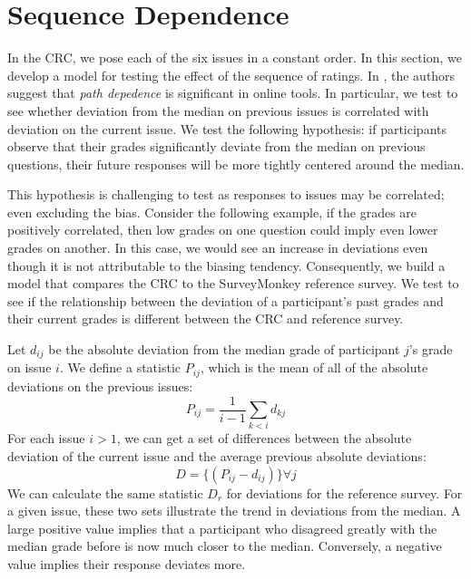 \section{Sequence Dependence}
\label{path}
In the CRC, we pose each of the six issues in a constant order.
In this section, we develop a model for testing the effect of the sequence of ratings.
In \cite{???}, the authors suggest that \emph{path depedence} is significant in online tools.
In particular, we test to see whether deviation from the median on previous issues is correlated with deviation on the current issue.
We test the following hypothesis: if participants observe that their grades significantly deviate from the median on previous questions, their future responses will be more tightly centered around the median.

This hypothesis is challenging to test as responses to issues may be correlated; even excluding the bias.
Consider the following example, if the grades are positively correlated, then low grades on one question could imply even lower grades on another.
In this case, we would see an increase in deviations even though it is not attributable to the biasing tendency.
Consequently, we build a model that compares the CRC to the SurveyMonkey reference survey.
We test to see if the relationship between the deviation of a participant's past grades and their current grades is different between the CRC and reference survey.

Let $d_{ij}$ be the absolute deviation from the median grade of participant $j$'s grade on issue $i$. 
We define a statistic $P_{ij}$, which is the mean of all of the absolute deviations on the previous issues:
\begin{equation}
P_{ij} = \frac{1}{i-1} \sum_{k < i}  d_{kj}
\end{equation}
For each issue $i > 1$, we can get a set of differences between the absolute deviation of the current issue and the average previous absolute deviations:
\begin{equation}
D = \{(P_{ij}-d_{ij})\} \forall j
\end{equation}
We can calculate the same statistic $D_r$ for deviations for the reference survey.
For a given issue, these two sets illustrate the trend in deviations from the median.
A large positive value implies that a participant who disagreed greatly with the median grade before is now much closer to the median.
Conversely, a negative value implies their response deviates more.

